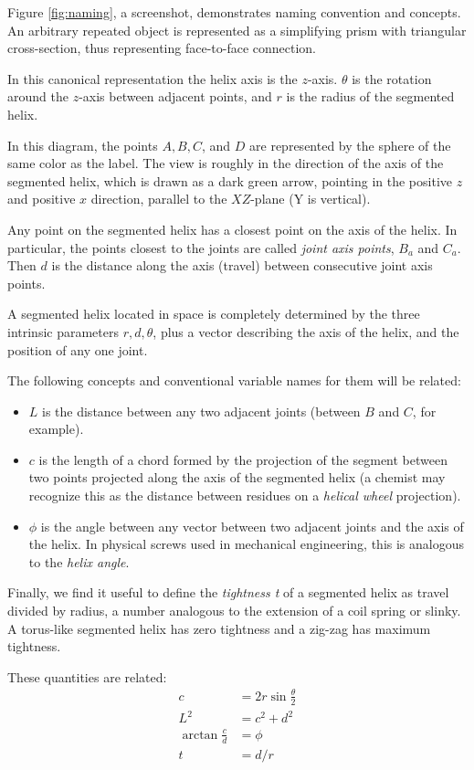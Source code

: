 \documentclass{svproc}
\begin{document}
Figure \ref{fig:naming}, a screenshot, demonstrates naming convention and concepts.
An arbitrary repeated object is represented as a simplifying prism
with triangular cross-section, thus representing face-to-face connection.

In this canonical representation the helix axis is
the $z$-axis.
$\theta$ is the rotation around the $z$-axis
between adjacent points, and
$r$ is the radius of the segmented helix.

In this diagram, the
points $A,B,C$, and $D$ are represented by the sphere of the same color as the label. The view is roughly in the direction of
the axis of the segmented helix, which is drawn as a dark green arrow, pointing in the positive $z$ and positive $x$ direction,
parallel to the $XZ$-plane (Y is vertical).

Any point on the segmented helix has a closest point on the axis of the helix.
In particular, the points closest to the
joints are called {\em joint axis points}, $B_a$ and $C_a$.
Then $d$ is the distance along the axis (travel) between consecutive joint axis points.

A segmented helix located in space is completely determined by
the three intrinsic parameters $r,d,\theta$, plus
a vector describing the axis
of the helix, and the position of any one joint.

The following concepts and conventional variable names for them will be related:
\begin{itemize}
\item $L$ is the distance between any two adjacent joints (between $B$ and $C$, for example).
  \item $c$ is the length of a chord formed by the projection of the segment between two points projected along the axis of the segmented helix (a chemist may recognize this as the distance between residues on a {\em helical wheel} projection).
\item $\phi$ is the angle between any vector between two adjacent joints and the axis of the helix. In physical screws used in mechanical engineering, this is analogous to the {\em helix angle}.
  \end{itemize}
Finally, we find it useful to define the {\em tightness t} of a segmented helix
as travel divided by radius, a number
analogous to the extension of a coil spring or slinky.
A torus-like segmented helix has zero tightness and a zig-zag has
maximum tightness.

These quantities are related:
\begin{align}
    c &= 2r\sin{\frac{\theta}{2}} \\
    L^2 &= c^2+d^2  \\
    \arctan{\frac{c}{d}}  &= \phi \\
    t &= d / r
\end{align}
\end{document}
